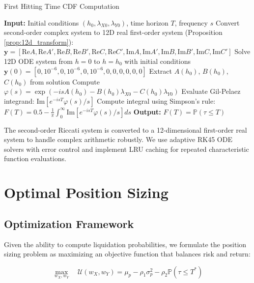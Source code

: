 \documentclass{article}
\renewcommand{\P}{\mathbb{P}}
\theoremstyle{definition}
\begin{document}
\begin{algorithm}
\caption{First Hitting Time CDF Computation}
\begin{algorithmic}[1]
\STATE \textbf{Input:} Initial conditions $(h_0, \lambda_{X0}, \lambda_{Y0})$, time horizon $T$, frequency $s$
\STATE Convert second-order complex system to 12D real first-order system (Proposition \ref{prop:12d_transform}):
\STATE $\mathbf{y} = [\text{Re}A, \text{Re}A', \text{Re}B, \text{Re}B', \text{Re}C, \text{Re}C', \text{Im}A, \text{Im}A', \text{Im}B, \text{Im}B', \text{Im}C, \text{Im}C']$
    \STATE Solve 12D ODE system from $h = 0$ to $h = h_0$ with initial conditions $\mathbf{y}(0) = [0, 10^{-6}, 0, 10^{-6}, 0, 10^{-6}, 0, 0, 0, 0, 0, 0]$
    \STATE Extract $A(h_0)$, $B(h_0)$, $C(h_0)$ from solution
    \STATE Compute $\varphi(s) = \exp(-is A(h_0) - B(h_0)\lambda_{X0} - C(h_0)\lambda_{Y0})$
    \STATE Evaluate Gil-Pelaez integrand: $\text{Im}[e^{-isT} \varphi(s) / s]$
\ENDFOR
\STATE Compute integral using Simpson's rule: $F(T) = 0.5 - \frac{1}{\pi} \int_0^{\infty} \text{Im}[e^{-isT} \varphi(s) / s] ds$
\STATE \textbf{Output:} $F(T) = \P(\tau \leq T)$
\end{algorithmic}
\end{algorithm}

The second-order Riccati system is converted to a 12-dimensional first-order real system to handle complex arithmetic robustly. We use adaptive RK45 ODE solvers with error control and implement LRU caching for repeated characteristic function evaluations.

\section{Optimal Position Sizing}

\subsection{Optimization Framework}

Given the ability to compute liquidation probabilities, we formulate the position sizing problem as maximizing an objective function that balances risk and return:

\begin{equation}
\max_{w_X, w_Y} \quad \mathcal{U}(w_X, w_Y) = \mu_p - \rho_1 \sigma_p^2 - \rho_2 \P(\tau \leq T^*) \label{eq:objective}
\end{equation}
\end{document}
